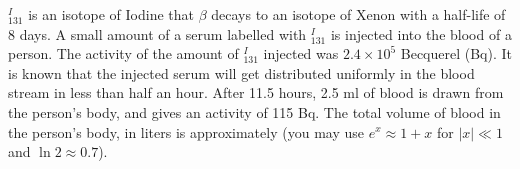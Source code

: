 
    \item \(_{131}^{I}\) is an isotope of Iodine that \(\beta\) decays to an isotope of Xenon with a half-life of 8 days. A small amount of a serum labelled with \(_{131}^{I}\) is injected into the blood of a person. The activity of the amount of \(_{131}^{I}\) injected was \(2.4 \times 10^5\) Becquerel (Bq). It is known that the injected serum will get distributed uniformly in the blood stream in less than half an hour. After 11.5 hours, 2.5 ml of blood is drawn from the person’s body, and gives an activity of 115 Bq. The total volume of blood in the person's body, in liters is approximately \underline{\hspace{2.5 cm}} (you may use \(e^x \approx 1 + x\) for \(|x| \ll 1\) and \(\ln 2 \approx 0.7\)).
